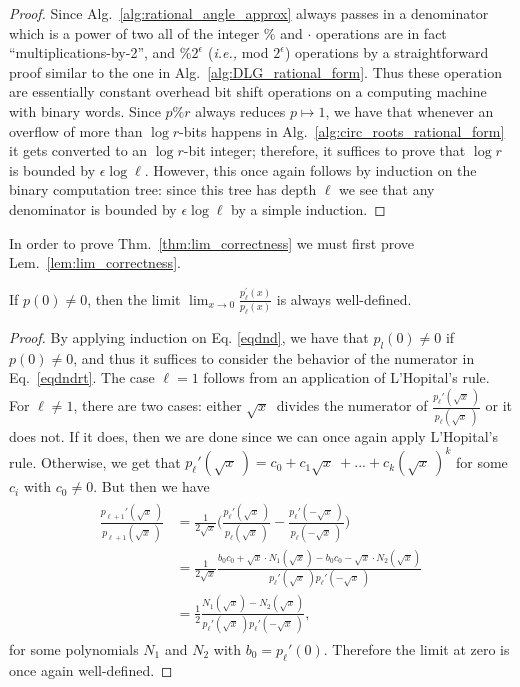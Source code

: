\documentclass[runningheads]{llncs}
\begin{document}
\begin{proof}
  Since Alg.~\ref{alg:rational_angle_approx} always passes in a denominator which is a power of two all of the integer $\%$ and $\cdot$ operations are in fact ``multiplications-by-2'', and $ \%2^\epsilon $ (\emph{i.e.,} mod $ 2^\epsilon $) operations by a straightforward proof similar to the one in Alg.~\ref{alg:DLG_rational_form}. Thus these operation are essentially constant overhead bit shift operations on a computing machine with binary words. Since $p\% r$ always reduces $p \mapsto 1$, we have that whenever an overflow of more than $\log r$-bits happens in Alg.~\ref{alg:circ_roots_rational_form} it gets converted to an $\log r$-bit integer; therefore, it suffices to prove that $\log r$ is bounded by  $\epsilon \log \ell $. However, this once again follows by induction on the binary computation tree: since this tree has depth $\ell$ we see that any denominator is bounded by $\epsilon \log \ell $ by a simple induction.
\end{proof}

In order to prove Thm.~\ref{thm:lim_correctness} we must first prove Lem.~\ref{lem:lim_correctness}.
\begin{lemma}\label{lem:lim_correctness}
   If $p(0) \neq 0$, then the limit $ \lim_{x \to 0}\frac{p_\ell^{\prime}(x)}{p_\ell(x)}$ is always well-defined.
   \end{lemma}
\begin{proof}
By applying induction on Eq. \ref{eqdnd}, we have that $p_l(0) \neq 0$ if $p(0) \neq 0$, and thus it suffices to consider the behavior of the numerator in  Eq.~\ref{eqdndrt}. The case $\ell = 1$ follows from an application of L'Hopital's rule. For $\ell \neq 1$, there are two cases: either $\sqrt x~$ divides the numerator of $\frac{p_{\ell}'(\sqrt x~)}{p_{\ell}(\sqrt x~)}$ or it does not. If it does, then we are done since we can once again apply L'Hopital's rule. Otherwise, we get that $p_{\ell}'(\sqrt x~) = c_0+c_1\sqrt x~ + ... +c_k(\sqrt x~)^k$ for some $c_i$ with $c_0 \neq 0$. But then we have
\begin{align*}
\begin{split}
\frac{p_{\ell+1}'(\sqrt x~)}{p_{\ell+1}(\sqrt x~)}
&= \frac{1}{2\sqrt x}\Big(\frac{p_{\ell}'(\sqrt x~)}{p_{\ell}(\sqrt x~)}-\frac{p_{\ell}'(-\sqrt x~)}{p_{\ell}(-\sqrt x~)}\Big) \\
& = \frac{1}{2\sqrt x}\frac{b_0c_0 + \sqrt x \cdot N_1(\sqrt x) - b_0c_0 - \sqrt x \cdot N_2(\sqrt x)}{p_{\ell}'(\sqrt x~)p_{\ell}'(-\sqrt x~)}\\
& = \frac{1}{2}\frac{  N_1(\sqrt x) -  N_2(\sqrt x)}{p_{\ell}'(\sqrt x~)p_{\ell}'(-\sqrt x~)},
\end{split}
\end{align*}
 for some polynomials $N_1$ and $N_2$ with $b_0 = p_{\ell}'(0)$. Therefore the limit at zero is once again well-defined.
\end{proof}
\end{document}
